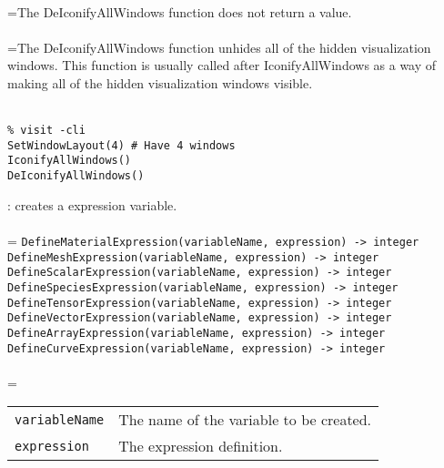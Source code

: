 \documentclass[10pt,a4paper]{report}
\begin{document}
 \\ 
\hangindent=\parindent The DeIconifyAllWindows function does not return a value. \\[-3mm] 

 \\ 
\hangindent=\parindent The DeIconifyAllWindows function unhides all of the hidden visualization windows. This function is usually called after IconifyAllWindows as a way of making all of the hidden visualization windows visible. \\[-3mm] 

\\[-6mm]
\begin{verbatim}% visit -cli
SetWindowLayout(4) # Have 4 windows
IconifyAllWindows()
DeIconifyAllWindows()
\end{verbatim}
\newpage


{}
: creates a expression variable.\\[-3mm]

 \\ 
\hangindent=\parindent 
\verb!DefineMaterialExpression(variableName, expression) -> integer!\\ 
\verb!DefineMeshExpression(variableName, expression) -> integer!\\ 
\verb!DefineScalarExpression(variableName, expression) -> integer!\\ 
\verb!DefineSpeciesExpression(variableName, expression) -> integer!\\ 
\verb!DefineTensorExpression(variableName, expression) -> integer!\\ 
\verb!DefineVectorExpression(variableName, expression) -> integer!\\ 
\verb!DefineArrayExpression(variableName, expression) -> integer!\\ 
\verb!DefineCurveExpression(variableName, expression) -> integer!\\ [-3mm]

 \\ 
\hangindent=\parindent 
\begin{tabular}{ll}
\verb!variableName! & The name of the variable to be created. \\
\verb!expression! & The expression definition. \\
\end{tabular} \\[-2mm]
\end{document}
